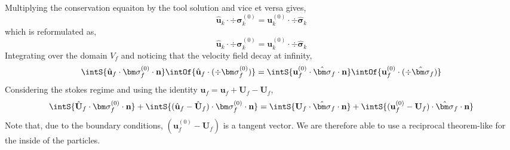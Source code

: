 Multiplying the conservation equaiton by the tool solution and vice et versa gives, 
\begin{equation*}
    \hat{\textbf{u}}_k\cdot \div \bm\sigma_k^{(0)}
    = 
    \textbf{u}_k^{(0)}\cdot \div \hat{\bm\sigma}_k
\end{equation*}
which is reformulated as, 
\begin{equation*}
    \hat{\textbf{u}}_k\cdot \div \bm\sigma_k^{(0)}
    = 
    \textbf{u}_k^{(0)}\cdot \div \hat{\bm\sigma}_k
\end{equation*}
Integrating over the domain $V_f$ and noticing that the velocity field decay at infinity, 
\begin{equation*}
    \intS{\hat{\textbf{u}}_f\cdot  \bm\sigma_f^{(0)} \cdot \textbf{n}}
    \intOf{\hat{\textbf{u}}_f\cdot  (\div \bm\sigma_f^{(0)})}
    = 
    \intS{\textbf{u}_f^{(0)}\cdot  \hat{\bm\sigma}_f \cdot \textbf{n}}
    \intOf{\textbf{u}_f^{(0)}\cdot ( \div \hat{\bm\sigma}_f)}
\end{equation*}
Considering the stokes regime and using the identity $\textbf{u}_f = \textbf{u}_f +\textbf{U}_f-\textbf{U}_f$, 
\begin{equation*}
    \intS{\hat{\textbf{U}}_f\cdot  \bm\sigma_f^{(0)} \cdot \textbf{n}     }
    + \intS{(\hat{\textbf{u}}_f - \hat{\textbf{U}}_f)\cdot  \bm\sigma_f^{(0)} \cdot \textbf{n}}
    = 
    \intS{\textbf{U}_f\cdot  \hat{\bm\sigma}_f \cdot \textbf{n}}
    + \intS{(\textbf{u}_f^{(0)} - \textbf{U}_f)\cdot  \hat{\bm\sigma}_f \cdot \textbf{n}}
\end{equation*}
Note that, due to the boundary conditions, $(\textbf{u}_f^{(0)} - \textbf{U}_f)$ is a tangent vector. 
We are therefore able to use a reciprocal theorem-like for the inside of the particles. 

